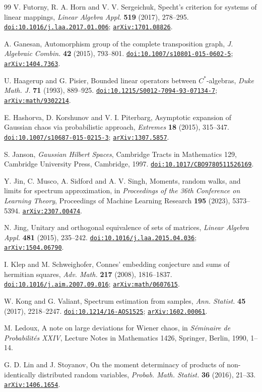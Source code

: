 \documentclass[11pt,a4paper]{amsart}
\numberwithin{equation}{section}
\theoremstyle{definition}
\theoremstyle{remark}
\newcommand{\arxiv}[1]{\href{https://arxiv.org/abs/#1}{\nolinkurl{arXiv:#1}}}
\newcommand{\doi}[1]{\href{https://doi.org/#1}{\nolinkurl{doi:#1}}}
\begin{document}
\begin{thebibliography}{99}
 V. Futorny, R. A. Horn and V. V. Sergeichuk,
Specht's criterion for systems of linear mappings,
\emph{Linear Algebra Appl.} \textbf{519} (2017), 278--295.
\doi{10.1016/j.laa.2017.01.006}; \arxiv{1701.08826}.

 A. Ganesan, Automorphism group of the complete transposition graph,
\emph{J. Algebraic Combin.} \textbf{42} (2015), 793--801. \doi{10.1007/s10801-015-0602-5}; \arxiv{1404.7363}.

 U. Haagerup and G. Pisier, Bounded linear operators between $C^*$-algebras,
\emph{Duke Math. J.} \textbf{71} (1993), 889--925.
\doi{10.1215/S0012-7094-93-07134-7}; \arxiv{math/9302214}.

 E. Hashorva, D. Korshunov and V. I. Piterbarg,
Asymptotic expansion of Gaussian chaos via probabilistic approach,
\emph{Extremes} \textbf{18} (2015), 315--347.
\doi{10.1007/s10687-015-0215-3}; \arxiv{1307.5857}.

 S. Janson, \emph{Gaussian Hilbert Spaces}, Cambridge Tracts in Mathematics 129,
Cambridge University Press, Cambridge, 1997. \doi{10.1017/CBO9780511526169}.

 Y. Jin, C. Musco, A. Sidford and A. V. Singh,
Moments, random walks, and limits for spectrum approximation,
in \emph{Proceedings of the 36th Conference on Learning Theory},
Proceedings of Machine Learning Research \textbf{195} (2023), 5373--5394.
\arxiv{2307.00474}.

 N. Jing, Unitary and orthogonal equivalence of sets of matrices,
\emph{Linear Algebra Appl.} \textbf{481} (2015), 235--242.
\doi{10.1016/j.laa.2015.04.036}; \arxiv{1504.06790}.

 I. Klep and M. Schweighofer,
Connes' embedding conjecture and sums of hermitian squares,
\emph{Adv. Math.} \textbf{217} (2008), 1816--1837.
\doi{10.1016/j.aim.2007.09.016}; \arxiv{math/0607615}.

 W. Kong and G. Valiant,
Spectrum estimation from samples,
\emph{Ann. Statist.} \textbf{45} (2017), 2218--2247.
\doi{10.1214/16-AOS1525}; \arxiv{1602.00061}.

 M. Ledoux, A note on large deviations for Wiener chaos,
in \emph{S\'eminaire de Probabilit\'es XXIV}, Lecture Notes in Mathematics 1426,
Springer, Berlin, 1990, 1--14.

 G. D. Lin and J. Stoyanov,
On the moment determinacy of products of non-identically distributed random variables,
\emph{Probab. Math. Statist.} \textbf{36} (2016), 21--33.
\arxiv{1406.1654}.


\end{thebibliography}
\end{document}
